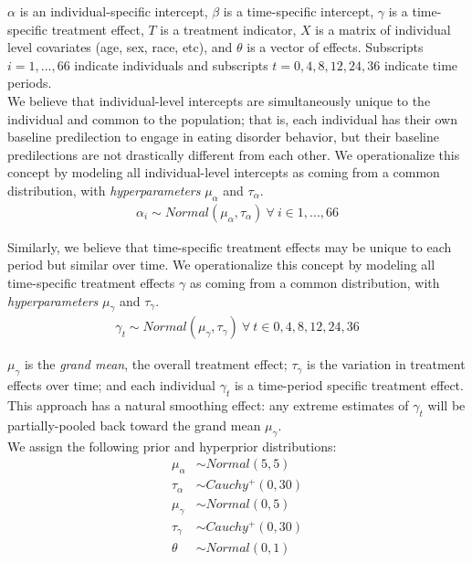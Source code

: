 \documentclass[12pt, oneside]{article}
\begin{document}
$\alpha$ is an individual-specific intercept, $\beta$ is a time-specific intercept, $\gamma$ is a time-specific treatment effect, $T$ is a treatment indicator, $X$ is a matrix of individual level covariates (age, sex, race, etc), and $\theta$ is a vector of effects. Subscripts $i = 1, ..., 66$ indicate individuals and subscripts $t = 0, 4, 8, 12, 24, 36$ indicate time periods.
\\

We believe that individual-level intercepts are simultaneously unique to the individual and common to the population; that is, each individual has their own baseline predilection to engage in eating disorder behavior, but their baseline predilections are not drastically different from each other.  We operationalize this concept by modeling all individual-level intercepts as coming from a common distribution, with \emph{hyperparameters} $\mu_{\alpha}$ and $\tau_{\alpha}$.
\begin{align}
\alpha_i \sim Normal(\mu_{\alpha}, \tau_{\alpha}) \ \forall \ i \in 1,...,66
\end{align} 

Similarly, we believe that time-specific treatment effects may be unique to each period but similar over time. We operationalize this concept by modeling all time-specific treatment effects $\gamma$ as coming from a common distribution, with \emph{hyperparameters} $\mu_{\gamma}$ and $\tau_{\gamma}$.
\begin{align}
\gamma_t \sim Normal(\mu_{\gamma}, \tau_{\gamma}) \ \forall \ t \in 0, 4, 8, 12, 24, 36
\end{align} 

$\mu_{\gamma}$ is the \emph{grand mean}, the overall treatment effect; $\tau_{\gamma}$ is the variation in treatment effects over time; and each individual $\gamma_t$ is a time-period specific treatment effect.  This approach has a natural smoothing effect: any extreme estimates of $\gamma_t$ will be partially-pooled back toward the grand mean $\mu_{\gamma}$.
\\

We assign the following prior and hyperprior distributions:
\begin{align}
\mu_{\alpha} &\sim Normal(5, 5) \\
\tau_{\alpha} &\sim Cauchy^+(0, 30) \\
\mu_{\gamma} &\sim Normal(0, 5) \\
\tau_{\gamma} &\sim Cauchy^+(0, 30) \\
\theta &\sim Normal(0, 1)
\end{align}
\end{document}
